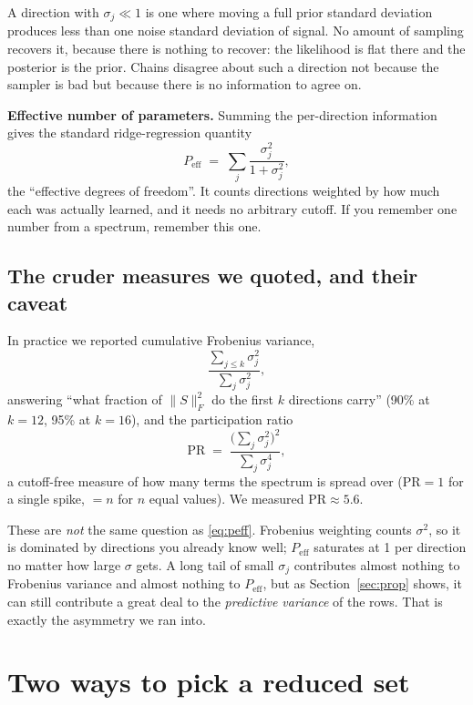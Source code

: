 \documentclass[11pt]{article}
\begin{document}
A direction with $\sigma_j \ll 1$ is one where moving a full prior standard
deviation produces less than one noise standard deviation of signal. No amount
of sampling recovers it, because there is nothing to recover: the likelihood is
flat there and the posterior is the prior. Chains disagree about such a
direction not because the sampler is bad but because there is no information to
agree on.

\medskip
\noindent\textbf{Effective number of parameters.} Summing the per-direction
information gives the standard ridge-regression quantity
\begin{equation}
  P_{\text{eff}} \;=\; \sum_j \frac{\sigma_j^{2}}{1+\sigma_j^{2}},
  \label{eq:peff}
\end{equation}
the ``effective degrees of freedom''. It counts directions weighted by how much
each was actually learned, and it needs no arbitrary cutoff. If you remember one
number from a spectrum, remember this one.

\subsection{The cruder measures we quoted, and their caveat}

In practice we reported cumulative Frobenius variance,
\[
  \frac{\sum_{j \le k}\sigma_j^{2}}{\sum_j \sigma_j^{2}},
\]
answering ``what fraction of $\|S\|_F^2$ do the first $k$ directions carry''
(90\% at $k=12$, 95\% at $k=16$), and the participation ratio
\[
  \mathrm{PR} \;=\; \frac{\big(\sum_j \sigma_j^2\big)^2}{\sum_j \sigma_j^4},
\]
a cutoff-free measure of how many terms the spectrum is spread over
($\mathrm{PR} = 1$ for a single spike, $= n$ for $n$ equal values). We measured
$\mathrm{PR} \approx 5.6$.

These are \emph{not} the same question as \eqref{eq:peff}. Frobenius weighting
counts $\sigma^2$, so it is dominated by directions you already know well;
$P_{\text{eff}}$ saturates at 1 per direction no matter how large $\sigma$ gets.
A long tail of small $\sigma_j$ contributes almost nothing to Frobenius variance
and almost nothing to $P_{\text{eff}}$, but as Section~\ref{sec:prop} shows, it
can still contribute a great deal to the \emph{predictive variance} of the rows.
That is exactly the asymmetry we ran into.

\section{Two ways to pick a reduced set}
\end{document}
